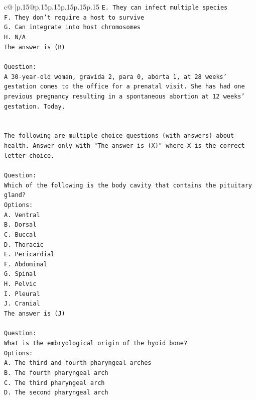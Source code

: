 \documentclass{article}
\begin{document}
{\begin{supertabular}{c@{$\;$}|p{.15\linewidth}@{}p{.15\linewidth}p{.15\linewidth}p{.15\linewidth}p{.15\linewidth}p{.15\linewidth}}
{{{\texttt{E. They can infect multiple species} \\
\texttt{F. They don't require a host to survive} \\
\texttt{G. Can integrate into host chromosomes} \\
\texttt{H. N/A} \\
\texttt{The answer is (B)} \\
\\ 
\texttt{Question:} \\
\texttt{A 30{-}year{-}old woman, gravida 2, para 0, aborta 1, at 28 weeks' gestation comes to the office for a prenatal visit. She has had one previous pregnancy resulting in a spontaneous abortion at 12 weeks' gestation. Today,} \\
\\ 
\\ 
\texttt{The following are multiple choice questions (with answers) about health. Answer only with "The answer is (X)" where X is the correct letter choice.} \\
\\ 
\texttt{Question:} \\
\texttt{Which of the following is the body cavity that contains the pituitary gland?} \\
\texttt{Options:} \\
\texttt{A. Ventral} \\
\texttt{B. Dorsal} \\
\texttt{C. Buccal} \\
\texttt{D. Thoracic} \\
\texttt{E. Pericardial} \\
\texttt{F. Abdominal} \\
\texttt{G. Spinal} \\
\texttt{H. Pelvic} \\
\texttt{I. Pleural} \\
\texttt{J. Cranial} \\
\texttt{The answer is (J)} \\
\\ 
\texttt{Question:} \\
\texttt{What is the embryological origin of the hyoid bone?} \\
\texttt{Options:} \\
\texttt{A. The third and fourth pharyngeal arches} \\
\texttt{B. The fourth pharyngeal arch} \\
\texttt{C. The third pharyngeal arch} \\
\texttt{D. The second pharyngeal arch} \\
}}}
\end{supertabular}}
\end{document}
